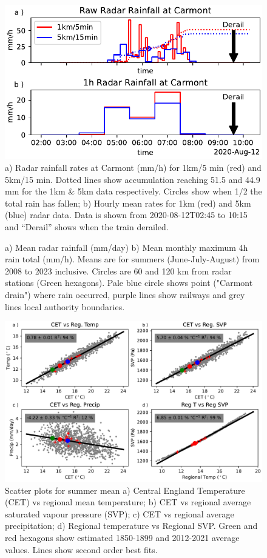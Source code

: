 \documentclass[11pt,a4paper]{article}
\begin{document}
\begin{figure}[tp]
	\centering
	\includegraphics[width=0.5\linewidth]{radar_carmont}
	\caption{a) Radar rainfall rates at Carmont (mm/h) for 1km/5 min (red) and 5km/15 min. Dotted lines show accumulation reaching 51.5 and 44.9 mm for the 1km \& 5km data respectively. Circles show when 1/2 the total rain has fallen; b) Hourly mean rates for 1km (red) and 5km (blue) radar data. Data is shown from 2020-08-12T02:45 to 10:15 and ``Derail'' shows when the train derailed. }
	\label{fig:aug2020_rain}
\end{figure}




\begin{figure}
	\centering
	\caption{a) Mean radar rainfall (mm/day) b) Mean monthly maximum 4h rain total (mm/h). Means are for summers (June-July-August) from 2008 to 2023 inclusive. Circles are  60 and 120 km from radar stations (Green hexagons). Pale blue circle shows point ("Carmont drain") where rain occurred, purple lines show railways and grey lines local authority boundaries. }
	\label{fig:mean_rain}
\end{figure}


\begin{figure}[tp]
	\centering
	\includegraphics[width=\linewidth]{scatter}
	\caption{Scatter plots for summer mean  a)  Central England Temperature (CET) vs  regional mean temperature; b) CET vs regional average saturated vapour pressure (SVP); c) CET vs regional average precipitation; d) Regional temperature vs Regional SVP. Green and red hexagons show estimated 1850-1899 and 2012-2021 average values. Lines show second order best fits.}
	\label{fig:cet_scatter}
\end{figure}
\end{document}
